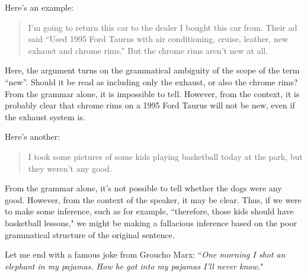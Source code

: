 Here's an example: 

\begin{quote}
I'm going to return this car to the
dealer I bought this car from. Their ad said ``Used 1995
Ford Taurus with air conditioning, cruise, leather, new
exhaust and chrome rims.'' But the chrome rims aren't
new at all.
\end{quote}

Here, the argument turns on the grammatical ambiguity of the scope of the term ``new''. Should it be read as including only the exhaust, or also 
the chrome rims? From the grammar alone, it is impossible to tell. However, from the context, it is probably clear that chrome rims on a 1995 Ford 
Taurus will not be new, even if the exhaust system is.

Here's another: 
\begin{quote}
I took some pictures of some kids playing basketball today at the park, but they weren't any good.\end{quote}

From the grammar alone, it's not possible to tell whether the dogs were any good. However, from the context of the speaker, it may be clear. Thus, 
if we were to make some inference, such as for example, ``therefore, those kids should have basketball lessons," we might be making a fallacious 
inference based on the poor grammatical structure of the original sentence.

Let me end with a famous joke from Groucho Marx: ``\emph{One morning I shot an elephant in my pajamas.
How he got into my pajamas I'll never know.}"









